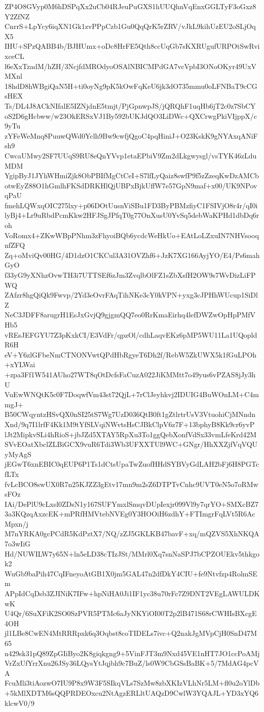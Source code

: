ZP4O8GVyp0M6hDSPqXx2uCb04RJeuPuGXS1hUUQhnVqEnxGGLTyF3oGxz8Y2ZfNZ
CnrrS+LpYcy6iqXN1Gk1zvPPpCzb1Gu0QqQrK5rZRV/vJkL9kihUzEU2oSLjOqX5
IHU+SPzQABB4b/BJHUmx+oDc8HrFE5Qth8ccUqGb7sKXRUgufURPOtSwRvixceCL
l6eXxTzadM/hZH/3NcjfdMROdyoOSAlNBICMPdGA7vcVpbI3ONoOKyr49UxVMXnl
18hdD8hWBgiQaN5H+ti0oyNg9pK5kOwFqKeU6jk3dO735mmu0oLFNBaT9cCGsHEX
Ts/DL4J8ACkNIfalE5IZNjdnE5tmjt/PjGpnwpJS/jQRQhF1uqHb6jT2c0z7SbCY
oS2D6gHcbww/w23OkERSxVJ1By592bUKJdQO3LiDWc+QXCrwgPkiVIjppX/c9yTu
zYFeWeMnq8PuuwQWd0Yclh9Bw9cwfjQgoC4pqHiniJ+O23KskK9gNYAxqANiFsh9
CwcaUMwy2SF7UUqS9RU8eQnYVvp1etaEPbiV9Zm2dLkgwysgl/vsTYK46zLduMDM
YgipByJ1JYhWHmiZjk8ObPBIfMgCtCeI+S7lfLyQaiz8swfP9f5zZzeqKwDzAMCb
otwEyZ88O1hGmlhFKSdDRKHlQjUBPxBjkUffW7e57GpN9maf+x00/UK9NPovqPaU
fmehLQWxqOIC275lxy+p06DOtUusnViSBu1FD3ByPBMzfiyC1FSIVjO8r4r/qI0i
lyBj4+Lr9uRbdPcmKkw2HFJSgJPfqT0g77OnXusU0YvSq5debWaKPHd1dbDq6roh
VoRomx4+ZKwWBpPNhm3zFhyoiBQb6ycdcWeHkUo+EAtLoLZxuIN7NHVsooqnfZFQ
Zq+oMviQv00HG/4D1dzO1CKCul3A31OVZhf6+JzK7XG166AyjYO/E4/Ps6mahGyO
f33yG9yXNhzOvwTH3i7UTTSEf6zJm3ZvqlbOlFZ1sZbXsfH2OW9s7WvDizLiFPWQ
ZAfzr8hgQiQk9Fwvp/2Yd3eOvrFAqTihNKe3cY0kVPN+yxg3cJPHhWUcup1SiDlZ
NeC3JDFF8arugrH1EsJxGvjQ9gjgmQQ7eo0RrKmaEirhq4lefDWZwOpHpPMfVHb5
vREsJEFGYU7Z3pKxkCI/E3VdFr/qpzOl/cdhLaqvEKz6pMP5WU11La1UQopldR6H
eV+Y6zlGFbeNmCTNONVwtQPdHbRgyeT6Dh2f/RebW5ZkUWX5k1fGuLPOh+xYLWai
+zpa3Ff1W541AUho27WT8qOtDcfsFaCuzA022JiKMMtt7o49yus6vPZAS8jJy3hU
VuEwWNQtK5c0F7DoqwfVm43st72QjL+7rClJeyhkvj2IDUIG4BuWOnLM+C4mmgJ+
B50CWqyntzHSvQX0nSI25tS7Wg7UzD036QtB0ft1gZtlrtrUsV3VtuohiCjMNndn
Xnd/9q7I1lrfF4Kk1M9tYfSLVqiNWvtsHsCJBkClpV6z7F+13bphyB8Kk9cr6yvP
lJt2MipkvSLi4hRioS+jbJZd5XTAY5RpXu3To1ggQebXonfVdSx33vmLfeKrd42M
SVvEOatXbclZLBiGCX9vuR6Tdi3Wb3UFXXTUl9WC+GNgr/HhXXZjfVqVQUyMyAgS
jEGwT6xnEBIC0qEUP6P1Ts1dCtsUpaTwZuofHHdSYBVyGdLAH2bFj6H8PGTcfLTx
fvLcBCO8swUX0R7n25KJZZ3gEtv17mn9m2sZ6DTPTvCnhc9UVT0eN5o7oRMwsFOz
IAi/DePlU9cLxsl0ZDsN1y167SUFYmxlSmqvDUpIexjr099Vl9y7qrYO+SMXcBZ7
3a3KQzqAxzcEK+mPRfHMVtebNVEg0Y3HOOiH6zdhY+FTImgrFqLVt5R6AcMpxn/j
M7nYRKA0gcPCdR5KdPztX7/NQ/zZJ5GKLKB47bavF+xq/mQZVS5XhNKQA7o3wIiG
Hd/NUWILW7y65N+ln5eLD38cTIzJSt/MMrl0Xq7snNaSPJ7bCPZOUEkv5thkgok2
WuGb9baPih47CqIFneyoAtGB1X0jm5GAL47n2dfDkY4CIU+fe9Ntvfzp4RolmSEm
APpIdCqDsb3ZJINiK7IFw+hpNiHA0Ji1IF1yc38u70rFc7Z9DNT2VEgLAWULDKwK
U4Qr/6SuXFiK2SO0SzPVR5PTMc6aJyNKYiOI00T2p2lB471S68rCWHIsBXcgE4OH
jl1LBe8CwEN4MtRRRpxk6q3Oqbst8coTIDELs7ivc+Q2nakJgMVpCjH0SnD47M65
n429sk31pQ89ZpGIiByo2K8giqkgng9+5VinFJT3m9Nxd45VE1nHT7JO1ccPoAMj
VrZxUfYrrXnu26JSy36LQysYtJqjbh9c7BuZ/ls0W9CbGSsBaBK+5/7MdAG4pcVA
FcuMli3tiAozwO7IU9P8x9W3F5SIkqVLs7SzMw8zbXKIzVLhNr5LM+fl0u2oYlDb
+5kMlXDTM6sQQPRDEOxcu2NtAgzERLltUAQzD9CwlW3YQAJL+YD3xYQ6klcwV0/9
